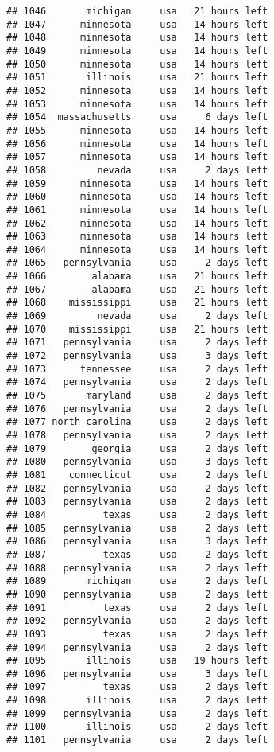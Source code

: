 \documentclass[
]{article}
\begin{document}
\begin{verbatim}
## 1046       michigan     usa   21 hours left
## 1047      minnesota     usa   14 hours left
## 1048      minnesota     usa   14 hours left
## 1049      minnesota     usa   14 hours left
## 1050      minnesota     usa   14 hours left
## 1051       illinois     usa   21 hours left
## 1052      minnesota     usa   14 hours left
## 1053      minnesota     usa   14 hours left
## 1054  massachusetts     usa     6 days left
## 1055      minnesota     usa   14 hours left
## 1056      minnesota     usa   14 hours left
## 1057      minnesota     usa   14 hours left
## 1058         nevada     usa     2 days left
## 1059      minnesota     usa   14 hours left
## 1060      minnesota     usa   14 hours left
## 1061      minnesota     usa   14 hours left
## 1062      minnesota     usa   14 hours left
## 1063      minnesota     usa   14 hours left
## 1064      minnesota     usa   14 hours left
## 1065   pennsylvania     usa     2 days left
## 1066        alabama     usa   21 hours left
## 1067        alabama     usa   21 hours left
## 1068    mississippi     usa   21 hours left
## 1069         nevada     usa     2 days left
## 1070    mississippi     usa   21 hours left
## 1071   pennsylvania     usa     2 days left
## 1072   pennsylvania     usa     3 days left
## 1073      tennessee     usa     2 days left
## 1074   pennsylvania     usa     2 days left
## 1075       maryland     usa     2 days left
## 1076   pennsylvania     usa     2 days left
## 1077 north carolina     usa     2 days left
## 1078   pennsylvania     usa     2 days left
## 1079        georgia     usa     2 days left
## 1080   pennsylvania     usa     3 days left
## 1081    connecticut     usa     2 days left
## 1082   pennsylvania     usa     2 days left
## 1083   pennsylvania     usa     2 days left
## 1084          texas     usa     2 days left
## 1085   pennsylvania     usa     2 days left
## 1086   pennsylvania     usa     3 days left
## 1087          texas     usa     2 days left
## 1088   pennsylvania     usa     2 days left
## 1089       michigan     usa     2 days left
## 1090   pennsylvania     usa     2 days left
## 1091          texas     usa     2 days left
## 1092   pennsylvania     usa     2 days left
## 1093          texas     usa     2 days left
## 1094   pennsylvania     usa     2 days left
## 1095       illinois     usa   19 hours left
## 1096   pennsylvania     usa     3 days left
## 1097          texas     usa     2 days left
## 1098       illinois     usa     2 days left
## 1099   pennsylvania     usa     2 days left
## 1100       illinois     usa     2 days left
## 1101   pennsylvania     usa     2 days left

\end{verbatim}
\end{document}
